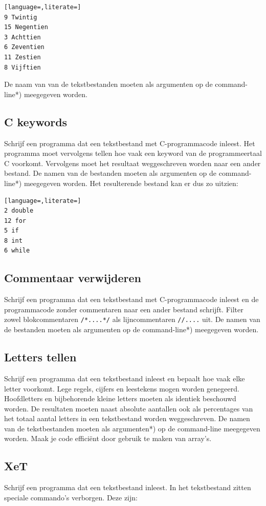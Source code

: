 \documentclass[a4paper,10pt,fleqn,twoside]{article}
\begin{document}
\begin{lstlisting}[language=,literate=]
9 Twintig
15 Negentien
3 Achttien
6 Zeventien
11 Zestien
8 Vijftien
\end{lstlisting}

De naam van van de tekstbestanden moeten als argumenten op de command-line*) meegegeven worden.

\subsection{C keywords}
Schrijf een programma dat een tekstbestand met C-programmacode inleest. Het programma moet vervolgens tellen hoe vaak een keyword van de programmeertaal C voorkomt. Vervolgens moet het resultaat weggeschreven worden naar een ander bestand. De namen van de bestanden moeten als argumenten op de command-line*) meegegeven worden.  Het resulterende bestand kan er dus zo uitzien:

\begin{lstlisting}[language=,literate=]
2 double
12 for
5 if
8 int
6 while
\end{lstlisting}

\subsection{Commentaar verwijderen}
Schrijf een programma dat een tekstbestand met C-programmacode inleest en de programmacode zonder commentaren naar een ander bestand schrijft. Filter zowel blokcommentaren \lstinline|/*....*/| als lijncommentaren \lstinline|//....| uit. De namen van de bestanden moeten als argumenten op de command-line*) meegegeven worden. 

\subsection{Letters tellen}
Schrijf een programma dat een tekstbestand inleest en bepaalt hoe vaak elke letter voorkomt. Lege regels, cijfers en leestekens mogen worden genegeerd. Hoofdletters en bijbehorende kleine letters moeten als identiek beschouwd worden. De resultaten moeten naast absolute aantallen ook als percentages van het totaal aantal letters in een tekstbestand worden weggeschreven. De namen van de tekstbestanden moeten als argumenten*) op de command-line meegegeven worden. Maak je code efficiënt door gebruik te maken van array's.

\subsection{XeT}
Schrijf een programma dat een tekstbestand inleest. In het tekstbestand zitten speciale commando's verborgen. Deze zijn:
\end{document}
